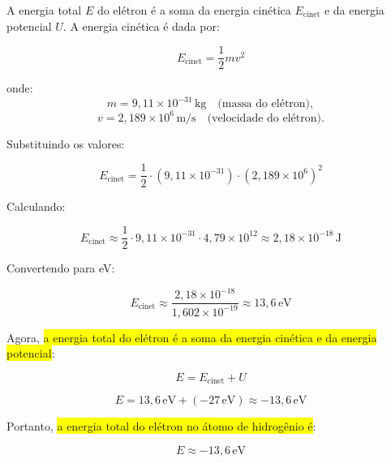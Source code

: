 \documentclass[a4paper,12pt]{article}
\begin{document}
\begin{flushleft}
A energia total \( E \) do elétron é a soma da energia cinética \( E_{\text{cinet}} \) e da energia potencial \( U \). A energia cinética é dada por:

\begin{equation}
E_{\text{cinet}} = \frac{1}{2} m v^2
\end{equation}

onde:
\begin{equation}
m = 9,11 \times 10^{-31} \, \text{kg} \quad \text{(massa do elétron)},
\end{equation}
\begin{equation}
v = 2,189 \times 10^6 \, \text{m/s} \quad \text{(velocidade do elétron)}.
\end{equation}

Substituindo os valores:

\begin{equation}
E_{\text{cinet}} = \frac{1}{2} \cdot (9,11 \times 10^{-31}) \cdot (2,189 \times 10^6)^2
\end{equation}

Calculando:

\begin{equation}
E_{\text{cinet}} \approx \frac{1}{2} \cdot 9,11 \times 10^{-31} \cdot 4,79 \times 10^{12} \approx 2,18 \times 10^{-18} \, \text{J}
\end{equation}

Convertendo para eV:

\begin{equation}
E_{\text{cinet}} \approx \frac{2,18 \times 10^{-18}}{1,602 \times 10^{-19}} \approx 13,6 \, \text{eV}
\end{equation}

Agora, \colorbox{yellow}{a energia total do elétron é a soma da energia cinética e da energia potencial}:

\begin{equation}
E = E_{\text{cinet}} + U
\end{equation}

\begin{equation}
E = 13,6 \, \text{eV} + (-27 \, \text{eV}) \approx -13,6 \, \text{eV}
\end{equation}

Portanto, \colorbox{yellow}{a energia total do elétron no átomo de hidrogênio é}:

\begin{equation}
\boxed{E \approx -13,6 \, \text{eV}}
\end{equation}
\end{flushleft}
\end{document}

